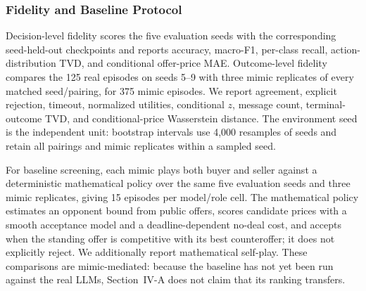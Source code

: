 \documentclass[conference]{IEEEtran}
\begin{document}
\subsubsection{Fidelity and Baseline Protocol}

Decision-level fidelity scores the five evaluation seeds with the corresponding seed-held-out checkpoints and reports accuracy, macro-F1, per-class recall, action-distribution TVD, and conditional offer-price MAE. Outcome-level fidelity compares the 125 real episodes on seeds 5--9 with three mimic replicates of every matched seed/pairing, for 375 mimic episodes. We report agreement, explicit rejection, timeout, normalized utilities, conditional $z$, message count, terminal-outcome TVD, and conditional-price Wasserstein distance. The environment seed is the independent unit: bootstrap intervals use 4{,}000 resamples of seeds and retain all pairings and mimic replicates within a sampled seed.

For baseline screening, each mimic plays both buyer and seller against a deterministic mathematical policy over the same five evaluation seeds and three mimic replicates, giving 15 episodes per model/role cell. The mathematical policy estimates an opponent bound from public offers, scores candidate prices with a smooth acceptance model and a deadline-dependent no-deal cost, and accepts when the standing offer is competitive with its best counteroffer; it does not explicitly reject. We additionally report mathematical self-play. These comparisons are mimic-mediated: because the baseline has not yet been run against the real LLMs, Section~IV-A does not claim that its ranking transfers.
\end{document}
